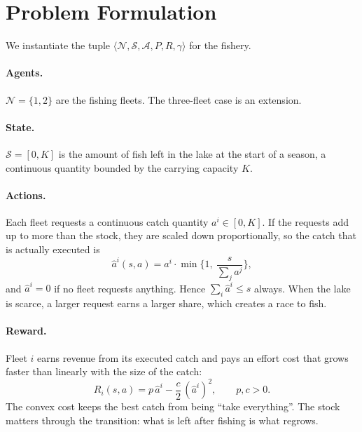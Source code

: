 \documentclass{article}
\begin{document}
\section{Problem Formulation}
\label{sec:formulation}
We instantiate the tuple $\langle \mathcal N,\mathcal S,\mathcal A,P,R,\gamma\rangle$ for the fishery.

\paragraph{Agents.} $\mathcal N=\{1,2\}$ are the fishing fleets. The three-fleet case is an extension.

\paragraph{State.} $\mathcal S=[0,K]$ is the amount of fish left in the lake at the start of a season, a continuous quantity bounded by the carrying capacity $K$.

\paragraph{Actions.} Each fleet requests a continuous catch quantity $a^i\in[0,K]$. If the requests add up to more than the stock, they are scaled down proportionally, so the catch that is actually executed is
\begin{equation}
\hat a^i(s,a)=a^i\cdot\min\Big\{1,\ \frac{s}{\sum_j a^j}\Big\},
\end{equation}
and $\hat a^i=0$ if no fleet requests anything. Hence $\sum_i\hat a^i\le s$ always. When the lake is scarce, a larger request earns a larger share, which creates a race to fish.

\paragraph{Reward.} Fleet $i$ earns revenue from its executed catch and pays an effort cost that grows faster than linearly with the size of the catch:
\begin{equation}
R_i(s,a)=p\,\hat a^i-\frac{c}{2}\,(\hat a^i)^2,\qquad p,c>0.
\end{equation}
The convex cost keeps the best catch from being ``take everything''. The stock matters through the transition: what is left after fishing is what regrows.
\end{document}
